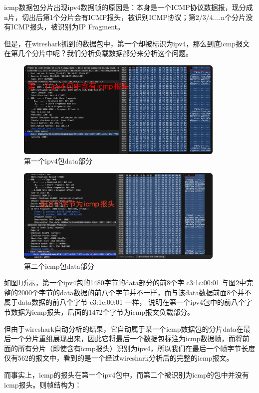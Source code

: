 \documentclass[a4paper,12pt]{report}
\begin{document}
\begin{spacing}{1.5}
icmp数据包分片出现ipv4数据帧的原因是：本身是一个ICMP协议数据报，现分成n片，切出后第1个分片会有ICMP报头，被识别ICMP协议；第2/3/4....n个分片没有ICMP报头，被识别为IP Fragment。

但是，在wireshark抓到的数据包中，第一个却被标识为ipv4，那么到底icmp报文在第几个分片中呢？我们分析负载数据部分来分析这个问题。

\begin{figure}[htb!]
  \centering
\includegraphics[width=10cm]{figure/2000_anly2.png}
\caption{第一个ipv4包data部分}
\label{pic:2000_ipv4_data}
\end{figure}

\begin{figure}[htb!]
  \centering
\includegraphics[width=10cm]{figure/2000_anly.png}
\caption{第二个icmp包data部分}
\label{pic:2000_icmp_data}
\end{figure}

如图\ref{pic:2000_ipv4_data}所示，第一个ipv4包的1480字节的data部分的前8个字 c3:1c:00:01 与图\ref{pic:2000_icmp_data}中完整的2000个字节的data数据的前八个字节并不一样，而与该data数据前面8个并不属于data数据的前八个字节 c3:1c:00:01 一样， 说明在第一个ipv4包中的前八个字节数据为icmp报头，后面的1472个字节为icmp报文负载部分。

但由于wireshark自动分析的结果，它自动属于某一个icmp数据包的分片data在最后一个分片重组展现出来，因此它将最后一个数据包标注为icmp数据帧，而将前面的所有分片（即使含有icmp报头）识别为ipv4，所以我们在最后一个帧字节长度仅有562的报文中，看到的是一个经过wireshark分析后的完整的icmp报文。

而事实上，icmp的报头在第一个ipv4包中，而第二个被识别为icmp的包中并没有icmp报头。则帧结构为：


\end{spacing}
\end{document}
